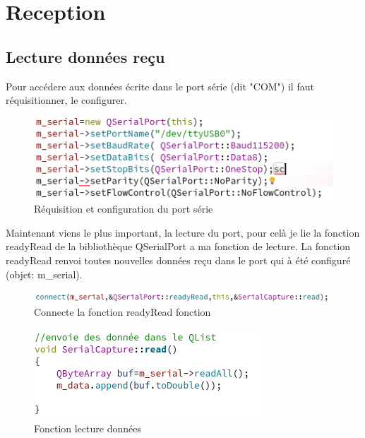 \chapter{Reception}

\section{Lecture données reçu}
Pour accédere aux données écrite dans le port série (dit "COM") il faut réquisitionner, le configurer.
\newline

\begin{figure}[H]
	\centering
    \includegraphics[width=0.7\linewidth]{Figures/config_comm.png}
    \decoRule
    \caption[
    Réquisition et configuration du port série]{
    Réquisition et configuration du port série}
    \label{fig:Réquisition et configuration du port série}
	\end{figure}

Maintenant viens le plus important, la lecture du port, pour celà je lie la fonction readyRead de la bibliothèque QSerialPort a ma fonction de lecture. La fonction readyRead renvoi toutes nouvelles données reçu dans le port qui à été configuré (objet: m_serial). 

\begin{figure}[H]
	\centering
    \includegraphics[width=\linewidth]{Figures/lien_read.png}
    \decoRule
    \caption[
    Connecte la fonction readyRead fonction]{
    Connecte la fonction readyRead fonction}
    \label{fig:Connecte la fonction readyRead fonction}
	\end{figure}
	
\begin{figure}[H]
	\centering
    \includegraphics[width=0.5\linewidth]{Figures/read.png}
    \decoRule
    \caption[
    Fonction lecture données]{
    Fonction lecture données}
    \label{fig:Fonction lecture données}
	\end{figure}
	


